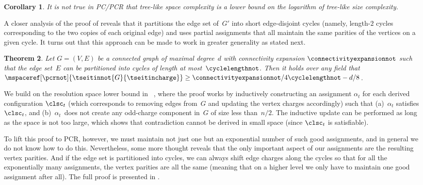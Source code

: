 \documentclass[11pt]{article}
\numberwithin{equation}{section}
\newtheorem{theorem}{Theorem}[section]
\newtheorem{corollary}[theorem]{Corollary}
\theoremstyle{definition}
\theoremstyle{plain}
\begin{document}
\begin{corollary}
  \label{cor:no-space-leq-log-length-bounf}
  It is \emph{not true} in PC/PCR
  that tree-like space complexity is %
  a lower bound on 
  the logarithm of tree-like size complexity.
\end{corollary}

\label{sec:tseitin-overview}

A closer analysis of the proof of
reveals that it partitions the edge set of~$G'$
into %
short  %
edge-disjoint cycles (namely, \mbox{length-$2$} cycles 
corresponding to the two copies of each original
edge) and uses partial assignments
%
that all maintain the same parities of the vertices on a given
cycle. It turns out that this approach can be made to work in
greater generality as stated next.

\begin{theorem}
  \label{th:tseitin-small-cycles-space-lower-bound}
  Let $G = (V,E)$ be a
  connected
  graph of %
  maximal degree~$d$  %
  with connectivity expansion $\connectivityexpansionnot$ such that 
  the edge set~$E$ can be partitioned into
  cycles of length at most~$\cyclelengthnot$.
  Then it holds over any field that
  $
  \mspaceref[\pcrnot]{\tseitinnot{G}{\tseitincharge}}\geq
  \connectivityexpansionnot/4\cyclelengthnot -d/8 
  $.
\end{theorem}

\begin{ourproof}[sketch]
%
%
  We build on the
  resolution space lower bound in~%
  \mbox{\cite{ABRW02SpaceComplexity,ET01SpaceBounds},}
  where the proof works by inductively constructing an assignment
  $\alpha_t$ for
  each derived configuration $\clsc_t$
  (which corresponds to removing edges 
  from~$G$
%
  and updating the vertex
  charges accordingly) such that
  (a)~$\alpha_t$ satisfies $\clsc_t$, and  
  (b)~$\alpha_t$~does not create any odd-charge component in~$G$ of 
  size less than~$n/2$.
  The inductive update 
  can be performed 
%
  as long as the space is not too large,
  which shows that contradiction cannot be derived in small space
  (since $\clsc_t$ is satisfiable).

  To lift this proof to PCR, however, 
%
  we must maintain not just one but an exponential number of such good
  assignments, and in general we do not know how to do this.
  Nevertheless, some more thought reveals that the only important
  aspect of our assignments are the resulting vertex parities.
  And if the edge set is partitioned into cycles, we can always shift
  edge charges along the cycles so that for all the exponentially many
  assignments,  
  the vertex parities
  are all the same (meaning 
  that on a higher level
  we only have to maintain one good assignment after  all). 
%
  The full proof is presented in .
\end{ourproof}
\end{document}
